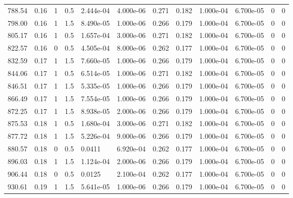 \documentclass[preview]{standalone}
\begin{document}
{{\begin{tabular}{L{1.2cm}C{1.2cm} C{0.3cm}C{0.5cm} C{1.4cm}C{1.4cm} C{1.4cm}C{1.4cm} C{1.6cm}C{1.6cm} C{1.6cm}C{1.6cm}}
  788.54  &  0.16  & 1     & 0.5 &  2.444e-04  & 4.000e-06  &  0.271&   0.182& 1.000e-04 & 6.700e-05   &  0 & 0  \\ 
  798.00  &  0.16  & 1     & 1.5 &  8.490e-05  & 1.000e-06  &  0.266&   0.179& 1.000e-04 & 6.700e-05   &  0 & 0  \\ 
  805.17  &  0.16  & 1     & 0.5 &  1.657e-04  & 3.000e-06  &  0.271&   0.182& 1.000e-04 & 6.700e-05   &  0 & 0  \\ 
  822.57  &  0.16  & 0     & 0.5 &  4.505e-04  & 8.000e-06  &  0.262&   0.177& 1.000e-04 & 6.700e-05   &  0 & 0  \\ 
  832.59  &  0.17  & 1     & 1.5 &  7.660e-05  & 1.000e-06  &  0.266&   0.179& 1.000e-04 & 6.700e-05   &  0 & 0  \\ 
  844.06  &  0.17  & 1     & 0.5 &  6.514e-05  & 1.000e-06  &  0.271&   0.182& 1.000e-04 & 6.700e-05   &  0 & 0  \\ 
  846.51  &  0.17  & 1     & 1.5 &  5.335e-05  & 1.000e-06  &  0.266&   0.179& 1.000e-04 & 6.700e-05   &  0 & 0  \\ 
  866.49  &  0.17  & 1     & 1.5 &  7.554e-05  & 1.000e-06  &  0.266&   0.179& 1.000e-04 & 6.700e-05   &  0 & 0  \\ 
  872.25  &  0.17  & 1     & 1.5 &  8.938e-05  & 2.000e-06  &  0.266&   0.179& 1.000e-04 & 6.700e-05   &  0 & 0  \\ 
  875.53  &  0.18  & 1     & 0.5 &  1.680e-04  & 3.000e-06  &  0.271&   0.182& 1.000e-04 & 6.700e-05   &  0 & 0  \\ 
  877.72  &  0.18  & 1     & 1.5 &  5.226e-04  & 9.000e-06  &  0.266&   0.179& 1.000e-04 & 6.700e-05   &  0 & 0  \\ 
  880.57  &  0.18  & 0     & 0.5 &  0.0411  & 6.920e-04  &  0.262&   0.177& 1.000e-04 & 6.700e-05   &  0 & 0  \\ 
  896.03  &  0.18  & 1     & 1.5 &  1.124e-04  & 2.000e-06  &  0.266&   0.179& 1.000e-04 & 6.700e-05   &  0 & 0  \\ 
  906.44  &  0.18  & 0     & 0.5 &  0.0125  & 2.100e-04  &  0.262&   0.177& 1.000e-04 & 6.700e-05   &  0 & 0  \\ 
  930.61  &  0.19  & 1     & 1.5 &  5.641e-05  & 1.000e-06  &  0.266&   0.179& 1.000e-04 & 6.700e-05   &  0 & 0  \\ 
\hline 
\end{tabular} 

}}
\end{document}
